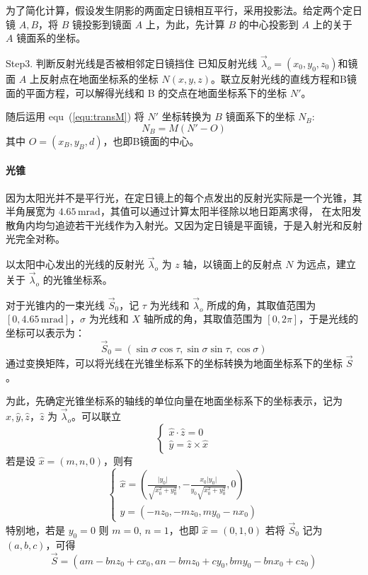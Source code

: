 \documentclass[../main.tex]{subfiles}
\begin{document}
为了简化计算，假设发生阴影的两面定日镜相互平行，采用投影法。给定两个定日镜 \(A, B\)，将 \(B\) 镜投影到镜面 \(A\) 上，为此，先计算 \(B\) 的中心投影到 \(A\) 上的关于 \(A\) 镜面系的坐标。

Step3. 判断反射光线是否被相邻定日镜挡住
已知反射光线 \(\vec \lambda _{o} = (x_0,y_0,z_0)\)和镜面 \(A\) 上反射点在地面坐标系的坐标 \(N\)\((x, y, z)\)。联立反射光线的直线方程和B镜面的平面方程，可以解得光线和 B 的交点在地面坐标系下的坐标 \(N'\)。

随后运用 equ~(\ref{equ:transM}) 将 \(N'\) 坐标转换为 \(B\) 镜面系下的坐标 \(N_{B}\):
\[
N_{B} = M (N' - O)
\]
其中 \(O = (x_{B} , y_{B} , d)\)，也即B镜面的中心。

\paragraph{光锥}
因为太阳光并不是平行光，在定日镜上的每个点发出的反射光实际是一个光锥，其半角展宽为 \(4.65 \, \mathrm{m}\mathrm{rad}\)，其值可以通过计算太阳半径除以地日距离求得，%
在太阳发散角内均匀追迹若干光线作为入射光。又因为定日镜是平面镜，于是入射光和反射光完全对称。

以太阳中心发出的光线的反射光 \(\vec\lambda _{o} \) 为 \(z\) 轴，以镜面上的反射点 \(N\) 为远点，建立关于 \(\vec \lambda _{o}\) 的光锥坐标系。

对于光锥内的一束光线 \(\vec S _{0}\)，记 \(\tau\) 为光线和 \(\vec\lambda _{o}\) 所成的角，其取值范围为 \([0, 4.65\, \mathrm{m}\mathrm{rad}]\)，\(\sigma\) 为光线和 \(X\) 轴所成的角，其取值范围为 \([0 , 2\pi ]\)，于是光线的坐标可以表示为：
\[
\vec S _{0} = (\sin \sigma \cos \tau, \sin \sigma \sin \tau, \cos \sigma)
\]
通过变换矩阵，可以将光线在光锥坐标系下的坐标转换为地面坐标系下的坐标 \(\vec S\)。

为此，先确定光锥坐标系的轴线的单位向量在地面坐标系下的坐标表示，记为 \(\hat x, \hat y, \hat z\)，\(\hat z\) 为 \(\vec \lambda _{o}\)。可以联立
\[
\begin{cases}
\hat x \cdot \hat z = 0\\
\hat y = \hat z \times \hat x
\end{cases}
\]
若是设 \(\hat x = (m , n , 0)\)，则有
\[
\begin{cases}
\displaystyle\hat x = \left(\frac{\vert y_{0} \vert}{\sqrt{x_{0}^{2}+ y _{0} ^{2}}}, {-}\frac{x_{0}\vert y_{0} \vert}{y_{0}\sqrt{x_{0}^{2}+y_{0}^{2}}}, 0\right)\\
\displaystyle \hat y = ({-} n z_{0}, - m z_{0} , my_{0} - n x_{0})
\end{cases}
\]
特别地，若是 \(y_{0} = 0\) 则 \(m = 0 \), \(n=1\)，也即 \(\hat x  = (0,1,0)\)
若将 \(\vec S_{0}\) 记为 \((a,b ,c)\)，可得
\begin{equation}
\vec S = (am - b nz _{0}+ c x_{0}, an - bmz_{0} + cy_{0}, bmy_{0} - bnx _{0} + cz_{0})
\end{equation}
\end{document}
